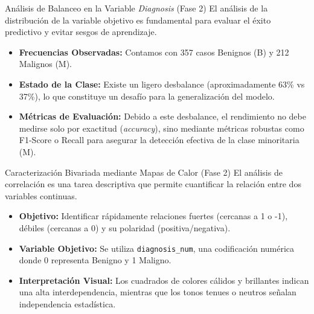 \documentclass{beamer}
\begin{document}
	\begin{frame}{Análisis de Balanceo en la Variable \textit{Diagnosis} (Fase 2)}
		El análisis de la distribución de la variable objetivo es fundamental para evaluar el éxito predictivo y evitar sesgos de aprendizaje.
		
		\begin{itemize}
			\item<2-> \textbf{Frecuencias Observadas:} Contamos con 357 casos Benignos (B) y 212 Malignos (M).
			\item<3-> \textbf{Estado de la Clase:} Existe un ligero desbalance (aproximadamente 63\% vs 37\%), lo que constituye un desafío para la generalización del modelo.
			\item<4-> \textbf{Métricas de Evaluación:} Debido a este desbalance, el rendimiento no debe medirse solo por exactitud (\textit{accuracy}), sino mediante métricas robustas como F1-Score o Recall para asegurar la detección efectiva de la clase minoritaria (M).
		\end{itemize}
	\end{frame}
	
	\begin{frame}{Caracterización Bivariada mediante Mapas de Calor (Fase 2)}
		El análisis de correlación es una tarea descriptiva que permite cuantificar la relación entre dos variables continuas.
		
		\begin{itemize}
			\item<2-> \textbf{Objetivo:} Identificar rápidamente relaciones fuertes (cercanas a 1 o -1), débiles (cercanas a 0) y su polaridad (positiva/negativa).
			\item<3-> \textbf{Variable Objetivo:} Se utiliza \texttt{diagnosis\_num}, una codificación numérica donde 0 representa Benigno y 1 Maligno.
			\item<4-> \textbf{Interpretación Visual:} Los cuadrados de colores cálidos y brillantes indican una alta interdependencia, mientras que los tonos tenues o neutros señalan independencia estadística.
		\end{itemize}
	\end{frame}
	
\end{document}
